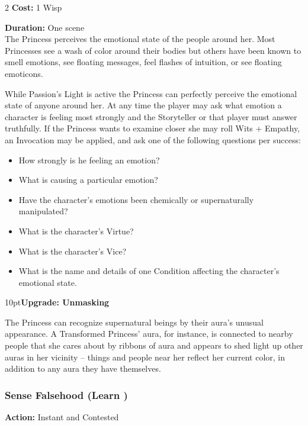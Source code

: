 \begin{multicols}{2}
\noindent \textbf{Cost:} 1 Wisp

\noindent \textbf{Duration:} One scene \\

\noindent The Princess perceives the emotional state of the people around her. Most Princesses see a wash of color around their bodies but others have been known to smell emotions, see floating messages, feel flashes of intuition, or see floating emoticons. 

While Passion's Light is active the Princess can perfectly perceive the emotional state of anyone around her. At any time the player may ask what emotion a character is feeling most strongly and the Storyteller or that player must answer truthfully. If the Princess wants to examine closer she may roll Wits + Empathy, an Invocation may be applied, and ask one of the following questions per success: 

\begin{itemize}
 \item How strongly is he feeling an emotion? 
 \item What is causing a particular emotion? 
 \item Have the character’s emotions been chemically or supernaturally manipulated? 
 \item What is the character’s Virtue?
 \item What is the character’s Vice?
 \item What is the name and details of one Condition affecting the character’s emotional state. 
\end{itemize}

\begin{myindentpar}{10pt}\textbf{Upgrade: Unmasking}

The Princess can recognize supernatural beings by their aura's unusual appearance. A Transformed Princess' aura, for instance, is connected to nearby people that she cares about by ribbons of aura and appears to shed light up other auras in her vicinity -- things and people near her reflect her current color, in addition to any aura they have themselves. \end{myindentpar}

\subsubsection*{Sense Falsehood (Learn \textbullet)}

\noindent \textbf{Action:} Instant and Contested


\end{multicols}
